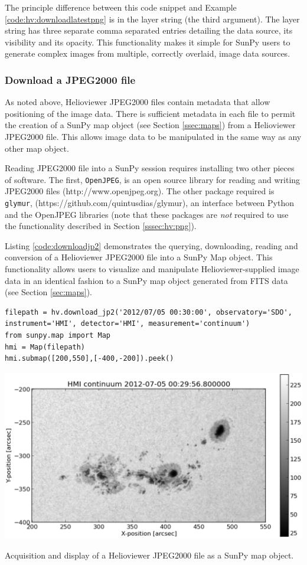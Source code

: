 The principle difference between this code snippet and Example
\ref{code:hv:downloadlatestpng} is in the layer string (the third
argument).  The layer string has three separate comma separated
entries detailing the data source, its visibility and its opacity.
This functionality makes it simple for SunPy users to generate complex
images from multiple, correctly overlaid, image data sources.


\subsubsection{Download a JPEG2000 file}\label{sssec:hv:jp}

As noted above, Helioviewer JPEG2000 files contain metadata that allow
positioning of the image data.  There is sufficient metadata in each
file to permit the creation of a SunPy map object (see Section
\ref{ssec:maps}) from a Helioviewer JPEG2000 file.  This allows image
data to be manipulated in the same way as any other map object.

Reading JPEG2000 file into a SunPy session requires installing two
other pieces of software. The first, \texttt{OpenJPEG}, is an open
source library for reading and writing JPEG2000 files
(http://www.openjpeg.org).  The other package required is
\texttt{glymur}, (https://github.com/quintusdias/glymur), an interface
between Python and the OpenJPEG libraries (note that these packages
are {\it not} required to use the functionality described in Section
\ref{sssec:hv:png}).

Listing \ref{code:downloadjp2} demonstrates the querying, downloading,
reading and conversion of a Helioviewer JPEG2000 file into a SunPy Map
object.  This functionality allows users to visualize and manipulate
Helioviewer-supplied image data in an identical fashion to a SunPy map
object generated from FITS data (see Section \ref{sec:maps}).

\begin{listing}
\begin{verbatim}
filepath = hv.download_jp2('2012/07/05 00:30:00', observatory='SDO', instrument='HMI', detector='HMI', measurement='continuum')
from sunpy.map import Map
hmi = Map(filepath)
hmi.submap([200,550],[-400,-200]).peek()
\end{verbatim}
\includegraphics[width=0.8\columnwidth]{helioviewer_hmi_continuum_jp2_to_map.eps}
\caption{Acquisition and display of a Helioviewer JPEG2000 file as a
  SunPy map object.}
\label{code:downloadjp2}
\end{listing}



